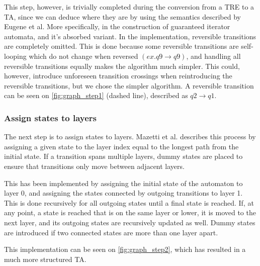 This step, however, is trivially completed during the conversion from a TRE to a TA, since we can deduce where they are by using the semantics described by Eugene et al.
More specifically, in the construction of guaranteed iterator automata, and it's absorbed variant\cite{Eugene2001}.
In the implementation, reversible transitions are completely omitted. This is done because some reversible transitions are self-looping which do not change when reversed $(ex. q9\rightarrow q9)$, and handling all reversible transitions equally makes the algorithm much simpler. This could, however, introduce unforeseen transition crossings when reintroducing the reversible transitions, but we chose the simpler algorithm. A reversible transition can be seen on \cref{fig:graph_step1} (dashed line), described as $q2\rightarrow q1$.

\begin{center}
    
\end{center}

\subsubsection{Assign states to layers}
The next step is to assign states to layers. Mazetti et al. describes this process by assigning a given state to the layer index equal to the longest path from the initial state. If a transition spans multiple layers, dummy states are placed to ensure that transitions only move between adjacent layers. \cite{Mazetti2012}

This has been implemented by assigning the initial state of the automaton to layer 0, and assigning the states connected by outgoing transitions to layer 1.
This is done recursively for all outgoing states until a final state is reached.
If, at any point, a state is reached that is on the same layer or lower, it is moved to the next layer, and its outgoing states are recursively updated as well.
Dummy states are introduced if two connected states are more than one layer apart.

This implementation can be seen on \cref{fig:graph_step2}, which has resulted in a much more structured TA.

\begin{center}
    
\end{center}

